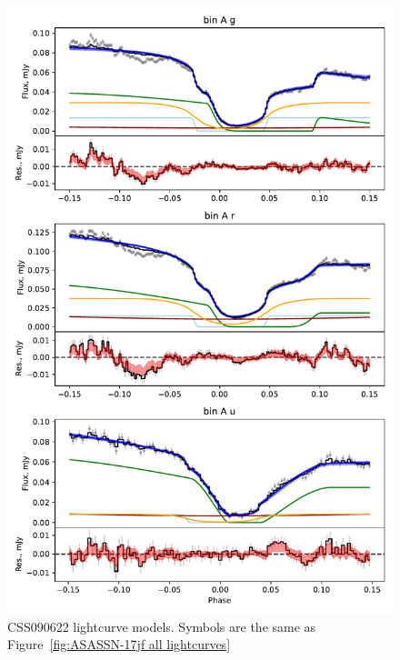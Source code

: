 \begin{figure}
    \centering
    \includegraphics[width=\textwidth]{figures/results/CSS090622/CSS090622_1.pdf}
    \caption{CSS090622 lightcurve models. Symbols are the same as Figure~\ref{fig:ASASSN-17jf all lightcurves}}
    \label{fig:CSS090622 all lightcurves}
\end{figure}
